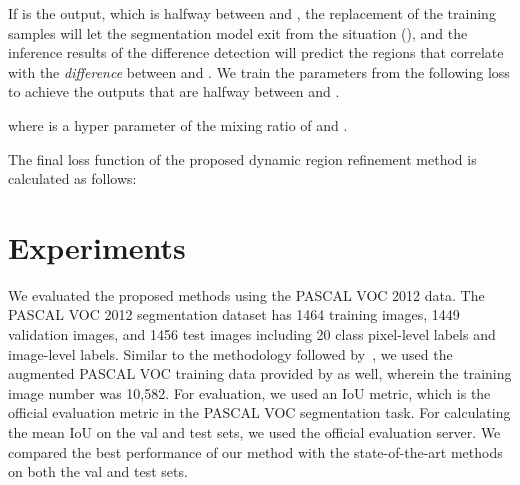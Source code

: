 \documentclass[10pt,twocolumn,letterpaper]{article}
\begin{document}
If  is the output, which is halfway between  and , the replacement of the training samples will let the segmentation model exit from the situation (), and the inference results of the difference detection will predict the regions that correlate with the {\it difference} between  and .
We train the parameters  from the following loss to achieve the outputs that are halfway between  and .

where  is a hyper parameter of the mixing ratio of  and  .

The final loss function of the proposed dynamic region refinement method is calculated as follows:


\section{Experiments}
We evaluated the proposed methods using the PASCAL VOC 2012 data. 
The PASCAL VOC 2012 segmentation dataset has 1464 training images, 1449
validation images, and 1456 test images including 20 class pixel-level
labels and image-level labels. 
Similar to the methodology followed by~\cite{ped15,papa15,sec}, 
we used the augmented PASCAL VOC training data provided by \cite{Bha14} as well, wherein the training image number was 10,582.
For evaluation, we used an IoU metric, which is the official evaluation metric in the PASCAL VOC segmentation task.
For calculating the mean IoU on the val and test sets, we used the official evaluation server.
We compared the best performance of our method with the state-of-the-art methods on both the val and test sets.
\end{document}

